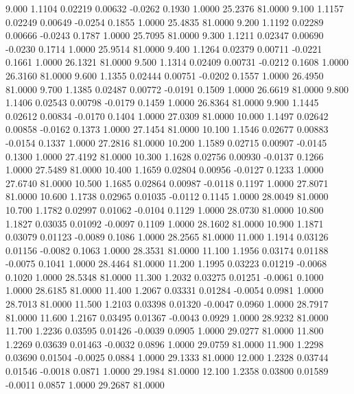    9.000   1.1104   0.02219   0.00632  -0.0262   0.1930   1.0000  25.2376  81.0000
   9.100   1.1157   0.02249   0.00649  -0.0254   0.1855   1.0000  25.4835  81.0000
   9.200   1.1192   0.02289   0.00666  -0.0243   0.1787   1.0000  25.7095  81.0000
   9.300   1.1211   0.02347   0.00690  -0.0230   0.1714   1.0000  25.9514  81.0000
   9.400   1.1264   0.02379   0.00711  -0.0221   0.1661   1.0000  26.1321  81.0000
   9.500   1.1314   0.02409   0.00731  -0.0212   0.1608   1.0000  26.3160  81.0000
   9.600   1.1355   0.02444   0.00751  -0.0202   0.1557   1.0000  26.4950  81.0000
   9.700   1.1385   0.02487   0.00772  -0.0191   0.1509   1.0000  26.6619  81.0000
   9.800   1.1406   0.02543   0.00798  -0.0179   0.1459   1.0000  26.8364  81.0000
   9.900   1.1445   0.02612   0.00834  -0.0170   0.1404   1.0000  27.0309  81.0000
  10.000   1.1497   0.02642   0.00858  -0.0162   0.1373   1.0000  27.1454  81.0000
  10.100   1.1546   0.02677   0.00883  -0.0154   0.1337   1.0000  27.2816  81.0000
  10.200   1.1589   0.02715   0.00907  -0.0145   0.1300   1.0000  27.4192  81.0000
  10.300   1.1628   0.02756   0.00930  -0.0137   0.1266   1.0000  27.5489  81.0000
  10.400   1.1659   0.02804   0.00956  -0.0127   0.1233   1.0000  27.6740  81.0000
  10.500   1.1685   0.02864   0.00987  -0.0118   0.1197   1.0000  27.8071  81.0000
  10.600   1.1738   0.02965   0.01035  -0.0112   0.1145   1.0000  28.0049  81.0000
  10.700   1.1782   0.02997   0.01062  -0.0104   0.1129   1.0000  28.0730  81.0000
  10.800   1.1827   0.03035   0.01092  -0.0097   0.1109   1.0000  28.1602  81.0000
  10.900   1.1871   0.03079   0.01123  -0.0089   0.1086   1.0000  28.2565  81.0000
  11.000   1.1914   0.03126   0.01156  -0.0082   0.1063   1.0000  28.3531  81.0000
  11.100   1.1956   0.03174   0.01188  -0.0075   0.1041   1.0000  28.4464  81.0000
  11.200   1.1995   0.03223   0.01219  -0.0068   0.1020   1.0000  28.5348  81.0000
  11.300   1.2032   0.03275   0.01251  -0.0061   0.1000   1.0000  28.6185  81.0000
  11.400   1.2067   0.03331   0.01284  -0.0054   0.0981   1.0000  28.7013  81.0000
  11.500   1.2103   0.03398   0.01320  -0.0047   0.0960   1.0000  28.7917  81.0000
  11.600   1.2167   0.03495   0.01367  -0.0043   0.0929   1.0000  28.9232  81.0000
  11.700   1.2236   0.03595   0.01426  -0.0039   0.0905   1.0000  29.0277  81.0000
  11.800   1.2269   0.03639   0.01463  -0.0032   0.0896   1.0000  29.0759  81.0000
  11.900   1.2298   0.03690   0.01504  -0.0025   0.0884   1.0000  29.1333  81.0000
  12.000   1.2328   0.03744   0.01546  -0.0018   0.0871   1.0000  29.1984  81.0000
  12.100   1.2358   0.03800   0.01589  -0.0011   0.0857   1.0000  29.2687  81.0000

